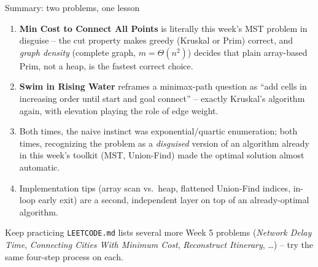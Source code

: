 \documentclass[11pt,aspectratio=169]{beamer}
\begin{document}
\begin{frame}{Summary: two problems, one lesson}
  \footnotesize
  \begin{enumerate}
    \item \textbf{Min Cost to Connect All Points} is literally this week's MST
    problem in disguise -- the cut property makes greedy (Kruskal or Prim)
    correct, and \emph{graph density} (complete graph, $m=\Theta(n^2)$) decides
    that plain array-based Prim, not a heap, is the fastest correct choice.
    \item \textbf{Swim in Rising Water} reframes a minimax-path question as
    ``add cells in increasing order until start and goal connect'' -- exactly
    Kruskal's algorithm again, with elevation playing the role of edge weight.
    \item Both times, the naive instinct was exponential/quartic
    enumeration; both times, recognizing the problem as a \emph{disguised}
    version of an algorithm already in this week's toolkit (MST, Union-Find)
    made the optimal solution almost automatic.
    \item Implementation tips (array scan vs.\ heap, flattened Union-Find
    indices, in-loop early exit) are a second, independent layer on top of an
    already-optimal algorithm.
  \end{enumerate}
  \begin{alertblock}{Keep practicing}
    \texttt{LEETCODE.md} lists several more Week 5 problems (\emph{Network Delay
    Time}, \emph{Connecting Cities With Minimum Cost}, \emph{Reconstruct
    Itinerary}, \dots) -- try the same four-step process on each.
  \end{alertblock}
\end{frame}
\end{document}
